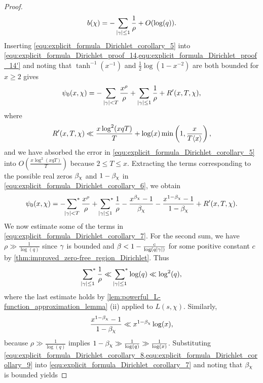 \begin{proof}
      \begin{equation}\label{equ:explicit_formula_Dirichlet_corollary_5}
        b(\chi) = -\sum_{|\gamma| \le 1}\frac{1}{\rho}+O(\log(q)).
      \end{equation}
      Inserting \cref{equ:explicit_formula_Dirichlet_corollary_5} into \cref{equ:explicit_formula_Dirichlet_proof_14,equ:explicit_formula_Dirichlet_proof_14'} and noting that $\tanh^{-1}(x^{-1})$ and $\frac{1}{2}\log(1-x^{-2})$ are both bounded for $x \ge 2$ gives
      \begin{equation}\label{equ:explicit_formula_Dirichlet_corollary_6}
        \psi_{0}(x,\chi) = -\sum_{|\gamma| < T}\frac{x^{\rho}}{\rho}+\sum_{|\gamma| \le 1}\frac{1}{\rho}+R'(x,T,\chi),
      \end{equation}
      where
      \[
        R'(x,T,\chi) \ll \frac{x\log^{2}(xqT)}{T}+\log(x)\min\left(1,\frac{x}{T\langle x\rangle}\right),
      \]
      and we have absorbed the error in \cref{equ:explicit_formula_Dirichlet_corollary_5} into $O\left(\frac{x\log^{2}(xqT)}{T}\right)$ because $2 \le T \le x$. Extracting the terms corresponding to the possible real zeros $\beta_{\chi}$ and $1-\beta_{\chi}$ in \cref{equ:explicit_formula_Dirichlet_corollary_6}, we obtain
      \begin{equation}\label{equ:explicit_formula_Dirichlet_corollary_7}
        \psi_{0}(x,\chi) = -\sideset{}{^{\ast}}\sum_{|\gamma| < T}\frac{x^{\rho}}{\rho}+\sideset{}{^{\ast}}\sum_{|\gamma| \le 1}\frac{1}{\rho}-\frac{x^{\beta_{\chi}}-1}{\beta_{\chi}}-\frac{x^{1-\beta_{\chi}}-1}{1-\beta_{\chi}}+R'(x,T,\chi).
      \end{equation}
      We now estimate some of the terms in \cref{equ:explicit_formula_Dirichlet_corollary_7}. For the second sum, we have $\rho \gg \frac{1}{\log(q)}$ since $\gamma$ is bounded and $\beta < 1-\frac{c}{\log(q|\gamma|)}$ for some positive constant $c$ by \cref{thm:improved_zero-free_region_Dirichlet}. Thus
      \begin{equation}\label{equ:explicit_formula_Dirichlet_corollary_8}
        \sideset{}{^{\ast}}\sum_{|\gamma| \le 1}\frac{1}{\rho} \ll \sideset{}{^{\ast}}\sum_{|\gamma| \le 1}\log(q) \ll \log^{2}(q),
      \end{equation}
      where the last estimate holds by \cref{lem:powerful_L-function_approximation_lemma} (ii) applied to $L(s,\chi)$. Similarly,
      \begin{equation}\label{equ:explicit_formula_Dirichlet_corollary_9}
        \frac{x^{1-\beta_{\chi}}-1}{1-\beta_{\chi}} \ll x^{1-\beta_{\chi}}\log(x),
      \end{equation}
      because $\rho \gg \frac{1}{\log(q)}$ implies $1-\beta_{\chi} \gg \frac{1}{\log(q)} \gg \frac{1}{\log(x)}$. Substituting \cref{equ:explicit_formula_Dirichlet_corollary_8,equ:explicit_formula_Dirichlet_corollary_9} into \cref{equ:explicit_formula_Dirichlet_corollary_7} and noting that $\beta_{\chi}$ is bounded yields

\end{proof}
